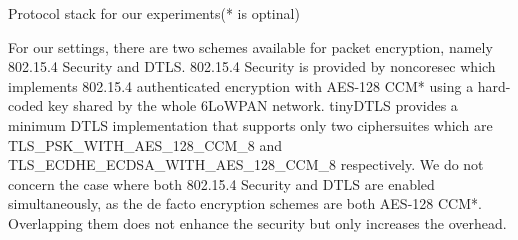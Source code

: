 \begin{table}[!h]
	\centering
	
	\caption{Protocol stack for our experiments(* is optinal)\label{Protocols}}
\end{table}


For our settings, there are two schemes available for packet encryption, namely 802.15.4 Security\cite{802154} and DTLS\cite{rfc6347}. 802.15.4 Security is provided by noncoresec\cite{noncoresec} which implements 802.15.4 authenticated encryption with AES-128 CCM*\cite{CCM} using a hard-coded key shared by the whole 6LoWPAN network. tinyDTLS\cite{tinydtls} provides a minimum DTLS implementation that supports only two ciphersuites which are TLS\_PSK\_WITH\_AES\_128\_CCM\_8\cite{rfc6655} and TLS\_ECDHE\_ECDSA\_WITH\_AES\_128\_CCM\_8\cite{rfc6655} respectively. We do not concern the case where both 802.15.4 Security and DTLS are enabled simultaneously, as the de facto encryption schemes are both AES-128 CCM*. Overlapping them does not enhance the security but only increases the overhead.